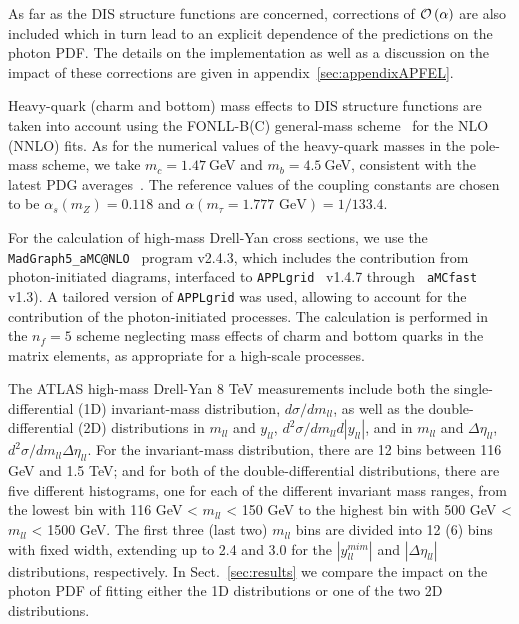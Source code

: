 As far as the DIS structure functions are concerned, corrections of
$\mathcal{O}\left( \alpha\right)$ are also included which in turn lead to an
explicit dependence of the predictions on the photon PDF.  The details
on the implementation as well as a discussion on the impact of these
corrections are given in appendix~\ref{sec:appendixAPFEL}.

Heavy-quark (charm and bottom) mass effects to DIS structure functions
are taken into account using the FONLL-B(C) general-mass
scheme~\cite{Forte:2010ta} for the NLO (NNLO) fits.
%
As for the numerical values of the heavy-quark masses in the pole-mass
scheme, we take $m_c=1.47~$GeV and $m_b=4.5~$GeV, consistent with the
latest PDG averages~\cite{Agashe:2014kda}.
%
The reference values of the coupling constants are chosen to be
$\alpha_s(m_Z)=0.118$ and $\alpha(m_\tau=1.777\mbox{ GeV})=1/133.4$.

For the calculation of high-mass Drell-Yan cross sections, we use the
{\tt MadGraph5{\_}aMC@NLO}~\cite{Alwall:2014hca} program v2.4.3, which
includes the contribution from photon-initiated diagrams, interfaced
to {\tt APPLgrid}~\cite{Carli:2010rw} v1.4.7 through {\tt
  aMCfast}~\cite{amcfast} v1.3).
%
A tailored version of {\tt APPLgrid} was used, allowing to account for
the contribution of the photon-initiated processes.
%
The calculation is performed in the $n_f=5$ scheme neglecting mass
effects of charm and bottom quarks in the matrix elements, as
appropriate for a high-scale processes.

The ATLAS high-mass Drell-Yan 8 TeV measurements include both the
single-differential (1D) invariant-mass distribution,
$d\sigma/dm_{ll}$, as well as the double-differential (2D)
distributions in $m_{ll}$ and $y_{ll}$,
$d^{2}\sigma/dm_{ll}d|y_{ll}|$, and in $m_{ll}$ and $\Delta\eta_{ll}$,
$d^{2}\sigma/dm_{ll}\Delta\eta_{ll}$.
%
For the invariant-mass distribution, there are 12 bins between 116 GeV
and 1.5 TeV; and for both of the double-differential distributions,
there are five different histograms, one for each of the different
invariant mass ranges, from the lowest bin with 116 GeV < $m_{ll}$ <
150 GeV to the highest bin with 500 GeV < $m_{ll}$ < 1500 GeV.
The first three (last two) $m_{ll}$ bins are divided into 12 (6) bins
with fixed width, extending up to 2.4 and 3.0 for the $|y_{ll}^{mim}|$
and $|\Delta\eta_{ll}|$ distributions, respectively.
%
In Sect.~\ref{sec:results} we compare the impact on the photon PDF of
fitting either the 1D distributions or one of the two 2D
distributions.

